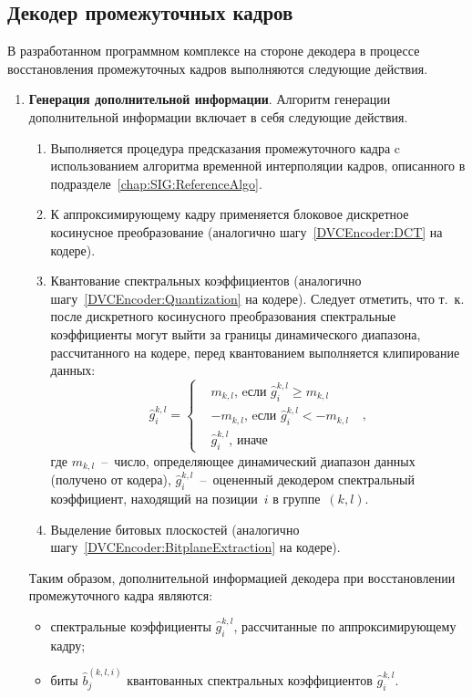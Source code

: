 \subsection{Декодер промежуточных кадров}
\label{chap:ExpResults:CodecModel:WZFramesDecoder}

В разработанном программном комплексе на стороне декодера в процессе восстановления промежуточных кадров выполняются следующие действия.
\begin{enumerate}
  \item \textbf{Генерация дополнительной информации}. Алгоритм генерации дополнительной информации включает в себя следующие действия.
  \begin{enumerate}
    \item Выполняется процедура предсказания промежуточного кадра c использованием алгоритма временной интерполяции кадров, описанного в подразделе~\ref{chap:SIG:ReferenceAlgo}.
    \item К аппроксимирующему кадру применяется блоковое дискретное косинусное преобразование (аналогично шагу~\ref{DVCEncoder:DCT} на кодере).
    \item Квантование спектральных коэффициентов (аналогично шагу~\ref{DVCEncoder:Quantization} на кодере). Следует отметить, что т.~к. после дискретного косинусного преобразования спектральные коэффициенты могут выйти за границы динамического диапазона, рассчитанного на кодере, перед квантованием выполняется клипирование данных:
    \begin{equation*}
    \hat{g}^{k,l}_i = \begin{cases}
    & m_{k,l}\text{, eсли $\hat{g}^{k,l}_i \geq m_{k,l}$ } \\
    & -m_{k,l}\text{, eсли $\hat{g}^{k,l}_i < -m_{k,l}$ } \\
    & \hat{g}^{k,l}_i\text{, иначе}
    \end{cases},
    \end{equation*}
    где $m_{k,l}$~--~число, определяющее динамический диапазон данных (получено от кодера), $\hat{g}^{k,l}_i$~--~оцененный декодером спектральный коэффициент, находящий на позиции~$i$ в группе~$(k,l)$.
    \item Выделение битовых плоскостей (аналогично шагу~\ref{DVCEncoder:BitplaneExtraction} на кодере).
   \end{enumerate}
   Таким образом, дополнительной информацией декодера при восстановлении промежуточного кадра являются:
   \begin{itemize}
     \item спектральные коэффициенты $\hat{g}^{k,l}_i$, рассчитанные по аппроксимирующему кадру;
     \item биты $\hat{b}_j^{(k,l,i)}$ квантованных спектральных коэффициентов $\hat{g}^{k,l}_i$.
   \end{itemize}


\end{enumerate}
